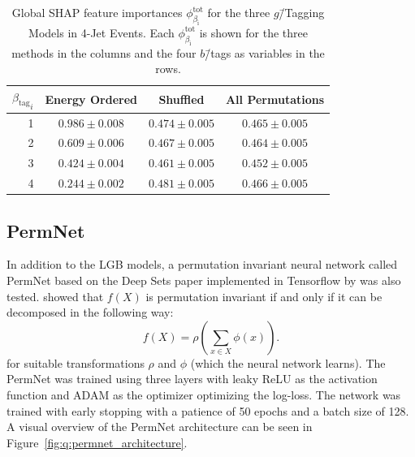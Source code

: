 \begin{table}[]
  \centerfloat
  \begin{tabular}{@{}rccc@{}}
  ${\beta_\mathrm{tag}}_i$  & Energy Ordered & Shuffled & All Permutations \\ \midrule
  1 & $ 0.986 \pm 0.008 $  &  $ 0.474 \pm 0.005 $  &  $ 0.465 \pm 0.005 $  \\
  2 & $ 0.609 \pm 0.006 $  &  $ 0.467 \pm 0.005 $  &  $ 0.464 \pm 0.005 $  \\
  3 & $ 0.424 \pm 0.004 $  &  $ 0.461 \pm 0.005 $  &  $ 0.452 \pm 0.005 $  \\
  4 & $ 0.244 \pm 0.002 $  &  $ 0.481 \pm 0.005 $  &  $ 0.466 \pm 0.005 $  \\ 
  \end{tabular}
  \caption[Global SHAP Feature Importances for the $g$\=/Tagging Models in 4-Jet Events]{Global SHAP feature importances $\phi^\mathrm{tot}_{\beta_\mathrm{i}}$ for the three $g$\=/Tagging Models in 4-Jet Events. Each $\phi^\mathrm{tot}_{\beta_\mathrm{i}}$ is shown for the three methods in the columns and the four $b$\=/tags as variables in the rows.}
  \label{table:q:shap_g_taggging_global_4j}
\end{table}


\subsection{PermNet}
\label{subsec:q:permnet}

In addition to the LGB models, a permutation invariant neural network called PermNet based on the Deep Sets paper \autocite{zaheerDeepSets2017} implemented in Tensorflow \citep{tensorflow2015-whitepaper} by \citet{fayeFrederikFayeDeepcalo} was also tested. \citet{zaheerDeepSets2017} showed that $f(X)$ is permutation invariant if and only if it can be decomposed in the following way:
\begin{equation}
  \label{eq:q:deep_sets}
  f(X)=\rho\left(\sum_{x\in X} \phi(x) \right).
\end{equation}
for suitable transformations $\rho$ and $\phi$ (which the neural network learns). The PermNet was trained using three layers with leaky ReLU \autocite{Maas2013RectifierNI} as the activation function and ADAM \autocite{kingmaAdamMethodStochastic2014} as the optimizer optimizing the log-loss. The network was trained with early stopping with a patience of \num{50} epochs and a batch size of \num{128}. A visual overview of the PermNet architecture can be seen in Figure~\ref{fig:q:permnet_architecture}.

